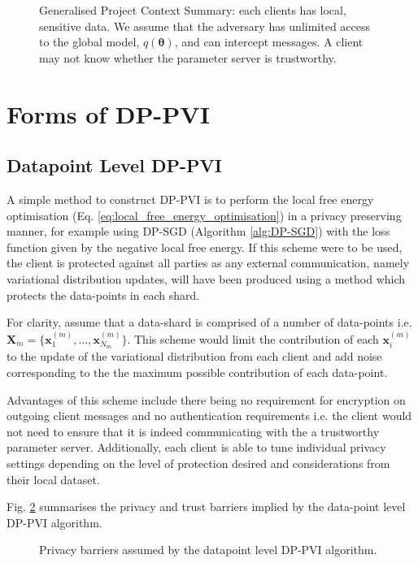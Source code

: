 \begin{figure}
	
	\centering
	\caption{\label{fig:design-context}Generalised Project Context Summary: each clients has local, sensitive data. We assume that the adversary has unlimited access to the global model, $q(\bm{\theta})$, and can intercept messages. A client may not know whether the parameter server is trustworthy. }
\end{figure}

\section{Forms of DP-PVI} 
\subsection{Datapoint Level DP-PVI}
A simple method to construct DP-PVI is to perform the local free energy optimisation (Eq. \ref{eq:local_free_energy_optimisation}) in a privacy preserving manner, for example using DP-SGD (Algorithm \ref{alg:DP-SGD}) with the loss function given by the negative local free energy. If this scheme were to be used, the client is protected against all parties as any external communication, namely variational distribution updates, will have been produced using a method which protects the data-points in each shard. 

For clarity, assume that a data-shard is comprised of a number of data-points i.e. $\bm{X}_m = \lbrace \bm{x}^{(m)}_1, \ldots, \bm{x}^{(m)}_{N_m} \rbrace$. This scheme would limit the contribution of each $\bm{x}^{(m)}_i$ to the update of the variational distribution from each client and add noise corresponding to the the maximum possible contribution of each data-point.  

Advantages of this scheme include there being no requirement for encryption on outgoing client messages and no authentication requirements i.e. the client would not need to ensure that it is indeed communicating with the a trustworthy parameter server. Additionally, each client is able to tune individual privacy settings depending on the level of protection desired and considerations from their local dataset. 

Fig. \ref{fig:design:datapointBarrier} summarises the privacy and trust barriers implied by the data-point level DP-PVI algorithm. 
\begin{figure}
	\centering
	
	\caption{Privacy barriers assumed by the datapoint level DP-PVI algorithm. }
	\label{fig:design:datapointBarrier}
\end{figure}

